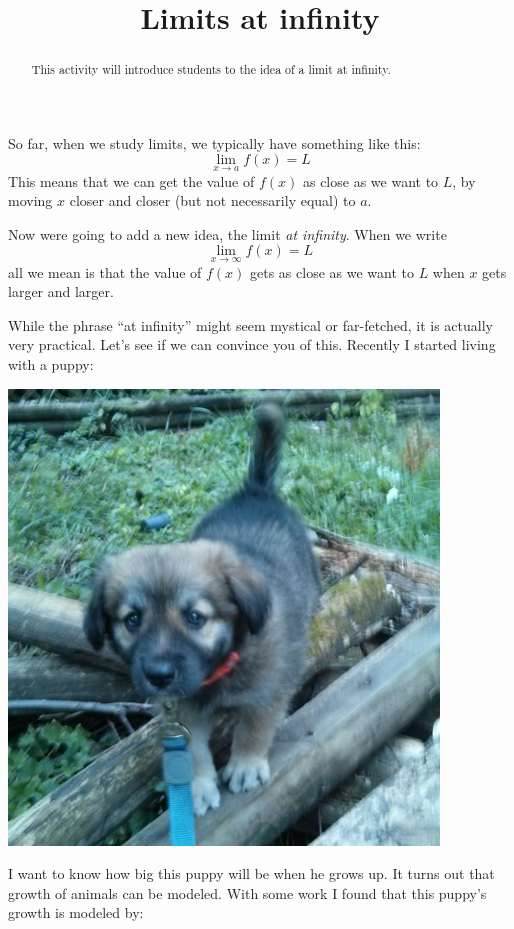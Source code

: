 \documentclass{ximera}
\title{Limits at infinity}
\begin{document}
\begin{abstract}
  This activity will introduce students to the idea of a limit at infinity.
\end{abstract}
\maketitle

So far, when we study limits, we typically have something like this:
\[
\lim_{x\to a} f(x) = L
\]
This means that we can get the value of $f(x)$ as close as we want to
$L$, by moving $x$ closer and closer (but not necessarily equal) to $a$. 

Now were going to add a new idea, the limit \textit{at infinity}. When
we write
\[
\lim_{x\to \infty} f(x) = L
\]
all we mean is that the value of $f(x)$ gets as close as we want to
$L$ when $x$ gets larger and larger. 

While the phrase ``at infinity'' might seem mystical or far-fetched,
it is actually very practical. Let's see if we can convince you of
this. Recently I started living with a puppy:

\begin{image}
\includegraphics{puppy.png}
\end{image}

I want to know how big this puppy will be when he grows up. It turns
out that growth of animals can be modeled. With some work I found that
this puppy's growth is modeled by:
\end{document}
